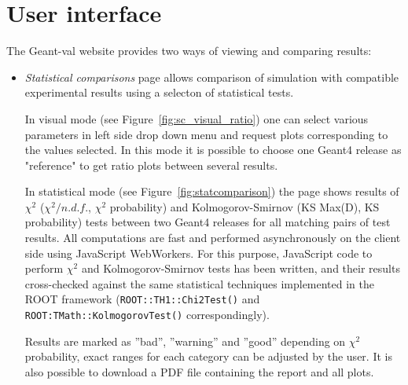 \section{User interface}
\label{sec-analyse}

The \textsf{Geant-val} website provides two ways of viewing and comparing results:

\begin{itemize}



\item \textit{Statistical comparisons} page allows comparison of simulation with compatible experimental results using a selecton of statistical tests. %

In visual mode  (see Figure~\ref{fig:sc_visual_ratio}) one can select various parameters in left side drop down menu and request plots corresponding to the values selected. In this mode it is possible to choose one Geant4 release as "reference" to get ratio plots between several results.

In statistical mode (see Figure~\ref{fig:statcomparison}) the page shows results of $\chi^2$ ($\chi^2/n.d.f.$, $\chi^2$ probability) and Kolmogorov-Smirnov (KS Max(D), KS probability) tests between two Geant4 releases for all matching pairs of test results.
All computations are fast and performed asynchronously on the client side using JavaScript WebWorkers. For this purpose, JavaScript code to perform $\chi^2$ and Kolmogorov-Smirnov tests has been written, and their results cross-checked against the same statistical techniques implemented in the ROOT framework ({\tt ROOT::TH1::Chi2Test()} and {\tt ROOT:TMath::KolmogorovTest()} correspondingly).

Results are marked as ''bad'', ''warning'' and ''good'' depending on $\chi^2$ probability, exact ranges for each category can be adjusted by the user. It is also possible to download a PDF file containing the report and all plots.


\end{itemize}
